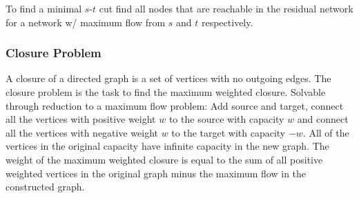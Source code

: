 To find a minimal $s$-$t$ cut find all nodes that are reachable in the
residual network for a network w/ maximum flow from $s$ and $t$
respectively.


\subsubsection{Closure Problem}

A closure of a directed graph is a set of vertices with no outgoing
edges.  The closure problem is the task to find the maximum weighted
closure.  Solvable through reduction to a maximum flow problem: Add
source and target, connect all the vertices with positive weight $w$
to the source with capacity $w$ and connect all the vertices with
negative weight $w$ to the target with capacity $-w$.  All of the
vertices in the original capacity have infinite capacity in the new
graph.  The weight of the maximum weighted closure is equal to the sum
of all positive weighted vertices in the original graph minus the
maximum flow in the constructed graph.

